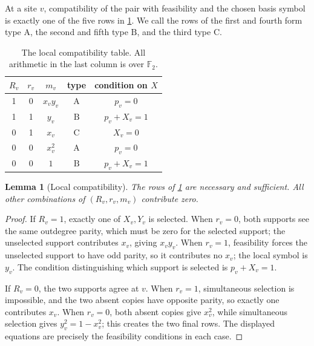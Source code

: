 \documentclass[10pt,letterpaper]{article}
\newtheorem{lemma}[theorem]{Lemma}
\newcommand{\FF}{\mathbb F_2}
\begin{document}
At a site \(v\), compatibility of the pair with feasibility and the chosen basis symbol is exactly one of the five rows in \cref{tab:local-types}.  We call the rows of the first and fourth form type \(\mathrm A\), the second and fifth type \(\mathrm B\), and the third type \(\mathrm C\).

\begin{table}[t]
\centering
\caption{The local compatibility table.  All arithmetic in the last column is over \(\FF\).}
\label{tab:local-types}
\begin{tabular}{ccccc}
\toprule
\(R_v\)&\(r_v\)&\(m_v\)&type&condition on \(X\)\\
\midrule
1&0&\(x_vy_v\)&\(\mathrm A\)&\(p_v=0\)\\
1&1&\(y_v\)&\(\mathrm B\)&\(p_v+X_v=1\)\\
0&1&\(x_v\)&\(\mathrm C\)&\(X_v=0\)\\
0&0&\(x_v^2\)&\(\mathrm A\)&\(p_v=0\)\\
0&0&\(1\)&\(\mathrm B\)&\(p_v+X_v=1\)\\
\bottomrule
\end{tabular}
\end{table}

\begin{lemma}[Local compatibility]\label{lem:local-compatibility}
The rows of \cref{tab:local-types} are necessary and sufficient.  All other combinations of \((R_v,r_v,m_v)\) contribute zero.
\end{lemma}

\begin{proof}
If \(R_v=1\), exactly one of \(X_v,Y_v\) is selected.  When \(r_v=0\), both supports see the same outdegree parity, which must be zero for the selected support; the unselected support contributes \(x_v\), giving \(x_vy_v\).  When \(r_v=1\), feasibility forces the unselected support to have odd parity, so it contributes no \(x_v\); the local symbol is \(y_v\).  The condition distinguishing which support is selected is \(p_v+X_v=1\).

If \(R_v=0\), the two supports agree at \(v\).  When \(r_v=1\), simultaneous selection is impossible, and the two absent copies have opposite parity, so exactly one contributes \(x_v\).  When \(r_v=0\), both absent copies give \(x_v^2\), while simultaneous selection gives \(y_v^2=1-x_v^2\); this creates the two final rows.  The displayed equations are precisely the feasibility conditions in each case.
\end{proof}
\end{document}
